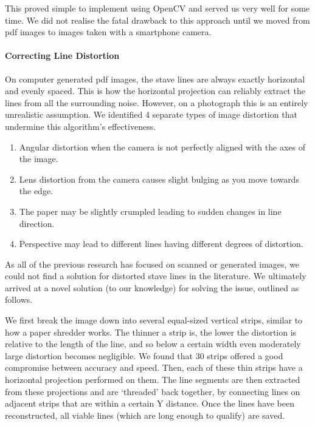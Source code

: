 This proved simple to implement using OpenCV and served us very well for some time. We did not realise the fatal drawback to this approach until we moved from pdf images to images taken with a smartphone camera. 

\paragraph{Correcting Line Distortion}

On computer generated pdf images, the stave lines are always exactly horizontal and evenly spaced. This is how the horizontal projection can reliably extract the lines from all the surrounding noise. However, on a photograph this is an entirely unrealistic assumption. We identified 4 separate types of image distortion that undermine this algorithm’s effectiveness.

\begin{enumerate}
\item{Angular distortion when the camera is not perfectly aligned with the axes of the image.}
\item{Lens distortion from the camera causes slight bulging as you move towards the edge.}
\item{The paper may be slightly crumpled leading to sudden changes in line direction.}
\item{Perspective may lead to different lines having different degrees of distortion.}
\end{enumerate}

As all of the previous research has focused on scanned or generated images, we could not find a solution for distorted stave lines in the literature. We ultimately arrived at a novel solution (to our knowledge) for solving the issue, outlined as follows.

We first break the image down into several equal-sized vertical strips, similar to how a paper shredder works. The thinner a strip is, the lower the distortion is relative to the length of the line, and so below a certain width even moderately large distortion becomes negligible. We found that 30 strips offered a good compromise between accuracy and speed. Then, each of these thin strips have a horizontal projection performed on them. The line segments are
then extracted from these projections and are ‘threaded’ back together, by connecting lines on adjacent strips that are within a certain Y distance. Once the lines have been reconstructed, all viable lines (which are long enough to qualify) are saved.


